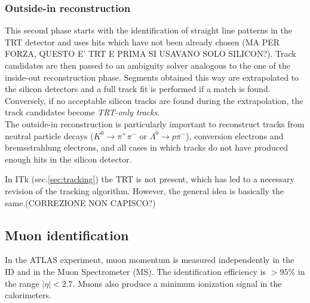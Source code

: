 \documentclass[a4paper,twoside,12pt]{article}
\begin{document}
\subsubsection*{Outside-in reconstruction}
This second phase starts with the identification of straight line patterns in the TRT detector
and uses hits which have not been already chosen (MA PER FORZA, QUESTO E' TRT E PRIMA SI USAVANO SOLO SILICON?). Track candidates are then passed to an ambiguity solver analogous to the one of the inside-out reconstruction phase. Segments obtained this way are extrapolated to the silicon detectors and a full track fit is performed if a match is found. Conversely, if no acceptable silicon tracks are found during 
the extrapolation, the track candidates become \textit{TRT-only tracks}. \\

The outside-in reconstruction is particularly important to reconstruct tracks from neutral particle decays ($K^0 \rightarrow \pi^+\pi^-$ or $\Lambda^0 \rightarrow p\pi^-$), conversion
electrons and bremsstrahlung electrons, and all cases in which tracks do not have
produced enough hits in the silicon detector. 

\bigskip
\bigskip
\bigskip

In ITk (sec.\ref{sec:tracking}) the TRT is not present, which has led to a necessary revision of the tracking algorithm. However, the general idea is basically the same\cite{Claudia}.(CORREZIONE NON CAPISCO?)

\subsection{Muon identification}
In the ATLAS experiment, muon momentum is measured independently in the ID and in the
Muon Spectrometer (MS). The identification efficiency is $> 95\%$\cite{PhysicsObjectReconstruction} in the
range $|\eta| < 2.7$. Muons also produce a minimum ionization signal in the calorimeters.\\

\end{document}
